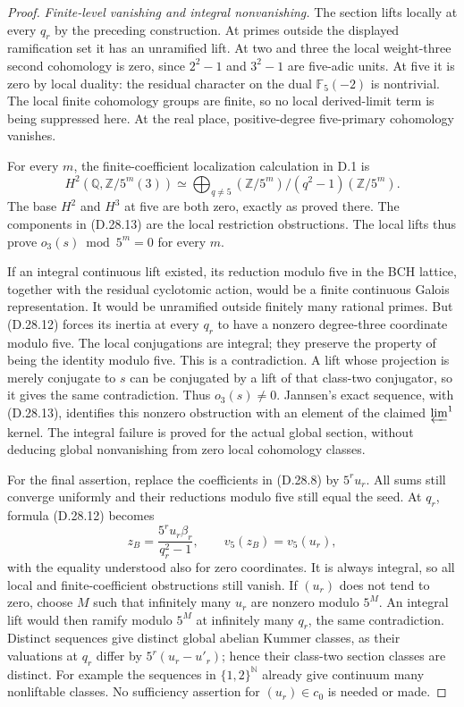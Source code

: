 \begin{proof}
\emph{Finite-level vanishing and integral nonvanishing.}
The section lifts locally at every
\(q_r\) by the preceding construction.
At primes outside the displayed
ramification set it has an unramified
lift. At two and three the local
weight-three second cohomology is zero,
since \(2^2-1\) and \(3^2-1\) are
five-adic units. At five it is zero
by local duality: the residual character
on the dual \(\mathbb F_5(-2)\) is
nontrivial. The local finite cohomology
groups are finite, so no local derived-limit
term is being suppressed here. At the
real place, positive-degree five-primary
cohomology vanishes.

For every \(m\), the finite-coefficient
localization calculation in D.1 is
\[
 H^2(\mathbb Q,\mathbb Z/5^m(3))
   \simeq\bigoplus_{q\ne5}
       (\mathbb Z/5^m)/(q^2-1)(\mathbb Z/5^m).
                                                               \tag{D.28.13}
\]
The base \(H^2\) and \(H^3\) at five
are both zero, exactly as proved there.
The components in (D.28.13) are the
local restriction obstructions. The
local lifts thus prove
\(o_3(s)\bmod5^m=0\) for every \(m\).

If an integral continuous lift existed,
its reduction modulo five in the BCH
lattice, together with the residual
cyclotomic action, would be a finite
continuous Galois representation. It
would be unramified outside finitely
many rational primes. But (D.28.12)
forces its inertia at every \(q_r\)
to have a nonzero degree-three
coordinate modulo five. The local
conjugations are integral; they preserve
the property of being the identity
modulo five. This is a contradiction.
A lift whose projection is merely
conjugate to \(s\) can be conjugated
by a lift of that class-two conjugator,
so it gives the same contradiction.
Thus \(o_3(s)\ne0\). Jannsen's exact
sequence, with (D.28.13), identifies
this nonzero obstruction with an element
of the claimed \(\varprojlim^1\) kernel.
The integral failure is proved for
the actual global section, without
deducing global nonvanishing from
zero local cohomology classes.

For the final assertion, replace the
coefficients in (D.28.8) by \(5^ru_r\).
All sums still converge uniformly and
their reductions modulo five still
equal the seed. At \(q_r\), formula
(D.28.12) becomes
\[
                 z_B=\frac{5^ru_r\beta_r}{q_r^2-1},
                 \qquad v_5(z_B)=v_5(u_r),      \tag{D.28.14}
\]
with the equality understood also for
zero coordinates. It is always integral,
so all local and finite-coefficient
obstructions still vanish. If \((u_r)\)
does not tend to zero, choose \(M\)
such that infinitely many \(u_r\) are
nonzero modulo \(5^M\). An integral
lift would then ramify modulo \(5^M\)
at infinitely many \(q_r\), the same
contradiction. Distinct sequences give
distinct global abelian Kummer classes,
as their valuations at \(q_r\) differ
by \(5^r(u_r-u'_r)\); hence their
class-two section classes are distinct.
For example the sequences in
\(\{1,2\}^{\mathbb N}\) already give
continuum many nonliftable classes.
No sufficiency assertion for
\((u_r)\in c_0\) is needed or made.
\end{proof}

